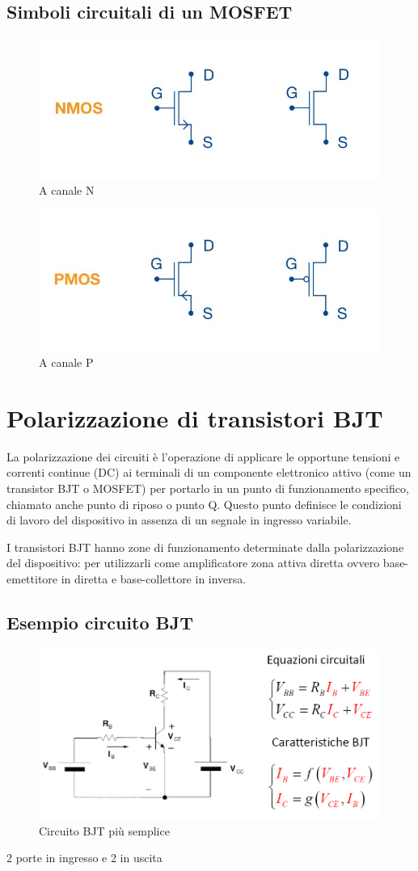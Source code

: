 \documentclass[11pt,a4paper,]{article}
\begin{document}
\subsection{Simboli circuitali di un MOSFET}
\begin{figure}[H]
    \centering
    \includegraphics[width=0.5\linewidth]{img/msfet na n.png}
    \caption{A canale N}
\end{figure}
\begin{figure}[H]
    \centering
    \includegraphics[width=0.5\linewidth]{img/msfte can p.png}
    \caption{A canale P}
\end{figure}

\section{Polarizzazione di transistori BJT}
\begin{definizione}
    La polarizzazione dei circuiti è l'operazione di applicare le opportune tensioni e correnti continue (DC) ai terminali di un componente elettronico attivo (come un transistor BJT o MOSFET) per portarlo in un punto di funzionamento specifico, chiamato anche punto di riposo o punto Q. Questo punto definisce le condizioni di lavoro del dispositivo in assenza di un segnale in ingresso variabile.
\end{definizione}
I transistori BJT hanno zone di funzionamento determinate dalla polarizzazione del dispositivo: per utilizzarli come amplificatore zona attiva diretta ovvero base-emettitore in diretta e base-collettore in inversa.
\subsection{Esempio circuito BJT}
\begin{figure}[H]
    \centering
    \includegraphics[width=0.75\linewidth]{img/circ sempl.png}
    \caption{Circuito BJT più semplice}
\end{figure}
2 porte in ingresso e 2 in uscita
\end{document}
